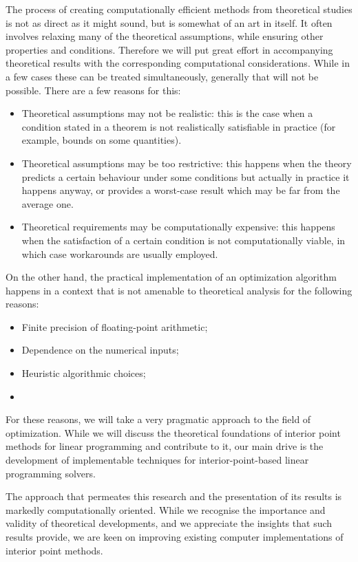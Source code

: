 The process of creating computationally efficient methods from
theoretical studies is not as direct as it might sound, but is somewhat
of an art in itself. It often involves relaxing many of the theoretical 
assumptions, while ensuring other properties and conditions.
Therefore we will put great effort in accompanying theoretical
results with the corresponding computational considerations. While
in a few cases these can be treated simultaneously, generally that
will not be possible. There are a few reasons for this:
\begin{itemize}
\item Theoretical assumptions may not be realistic: this is the case
when a condition stated in a theorem is not realistically satisfiable 
in practice (for example, bounds on some quantities). 
\item Theoretical assumptions may be too restrictive: this happens
when the theory predicts a certain behaviour under some conditions
but actually in practice it happens anyway, or provides a worst-case 
result which may be far from the average one.
\item Theoretical requirements may be computationally expensive: this 
happens when the satisfaction of a certain condition is not 
computationally viable, in which case workarounds are usually employed.
\end{itemize}

On the other hand, the practical implementation of an optimization
algorithm happens in a context that is not amenable to theoretical 
analysis for the following reasons:
\begin{itemize}
\item Finite precision of floating-point arithmetic;
\item Dependence on the numerical inputs;
\item Heuristic algorithmic choices;
\item 
\end{itemize}

For these reasons, we will take a very pragmatic approach to the
field of optimization. While we will discuss the theoretical foundations
of interior point methods for linear programming and contribute to
it, our main drive is the development of implementable techniques
for interior-point-based linear programming solvers.

The approach that permeates this research and 
the presentation of its results is markedly computationally oriented. 
While we recognise the importance and validity of theoretical developments, 
and we appreciate the insights that such results provide, 
we are keen on improving existing computer implementations of 
interior point methods.

